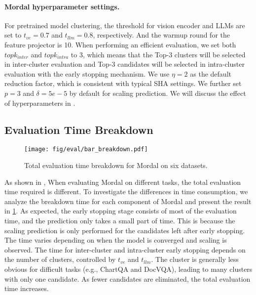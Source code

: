 \paragraph{Mordal hyperparameter settings.}  For pretrained model clustering, the threshold for vision encoder and LLMs are set to $t_{ve}=0.7$ and $t_{llm}=0.8$, respectively. And the warmup round for the feature projector is 10. When performing an efficient evaluation, we set both $topk_{inter}$ and $topk_{intra}$ to 3, which means that the Top-3 clusters will be selected in inter-cluster evaluation and Top-3 candidates will be selected in intra-cluster evaluation with the early stopping mechanism. We use $\eta=2$ as the default reduction factor, which is consistent with typical SHA settings. We further set $p=3$ and $\delta=5e-5$ by default for scaling prediction. We will discuss the effect of hyperparameters in . 

\subsection{Evaluation Time Breakdown}


\begin{figure}[!h]
\centering
\texttt{[image: fig/eval/bar\_breakdown.pdf]}
\caption{Total evaluation time breakdown for Mordal on six datasets.}
\label{fig:time_breakdown}
\end{figure}

As shown in , When evaluating Mordal on different tasks, the total evaluation time required is different. To investigate the differences in time consumption, we analyze the breakdown time for each component of Mordal and present the result in \ref{fig:time_breakdown}. As expected, the early stopping stage consists of most of the evaluation time, and the prediction only takes a small part of time. This is because the scaling prediction is only performed for the candidates left after early stopping. The time varies depending on when the model is converged and scaling is observed. The time for inter-cluster and intra-cluster early stopping depends on the number of clusters, controlled by $t_{ve}$ and $t_{llm}$. The cluster is generally less obvious for difficult tasks (e.g., ChartQA and DocVQA), leading to many clusters with only one candidate. As fewer candidates are eliminated, the total evaluation time increases.     



